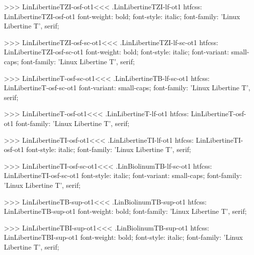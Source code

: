 {{{{{{{>>>
\<LinLibertineTZI-osf-ot1\><<<
.LinLibertineTZI-lf-ot1
htfcss:  LinLibertineTZI-osf-ot1  font-weight: bold; font-style: italic; font-family: 'Linux Libertine T', serif;

>>>
\<LinLibertineTZI-osf-sc-ot1\><<<
.LinLibertineTZI-lf-sc-ot1
htfcss:  LinLibertineTZI-osf-sc-ot1  font-weight: bold; font-style: italic; font-variant: small-caps; font-family: 'Linux Libertine T', serif;

>>>
\<LinLibertineT-osf-sc-ot1\><<<
.LinLibertineTB-lf-sc-ot1
htfcss:  LinLibertineT-osf-sc-ot1  font-variant: small-caps; font-family: 'Linux Libertine T', serif;

>>>
\<LinLibertineT-osf-ot1\><<<
.LinLibertineT-lf-ot1
htfcss:  LinLibertineT-osf-ot1  font-family: 'Linux Libertine T', serif;

>>>
\<LinLibertineTI-osf-ot1\><<<
.LinLibertineTI-lf-ot1
htfcss:  LinLibertineTI-osf-ot1  font-style: italic; font-family: 'Linux Libertine T', serif;

>>>
\<LinLibertineTI-osf-sc-ot1\><<<
.LinBiolinumTB-lf-sc-ot1
htfcss:  LinLibertineTI-osf-sc-ot1  font-style: italic; font-variant: small-caps; font-family: 'Linux Libertine T', serif;

>>>
\<LinLibertineTB-sup-ot1\><<<
.LinBiolinumTB-sup-ot1
htfcss:  LinLibertineTB-sup-ot1  font-weight: bold; font-family: 'Linux Libertine T', serif;

>>>
\<LinLibertineTBI-sup-ot1\><<<
.LinBiolinumTB-sup-ot1
htfcss:  LinLibertineTBI-sup-ot1  font-weight: bold; font-style: italic; font-family: 'Linux Libertine T', serif;

}}}}}}}
